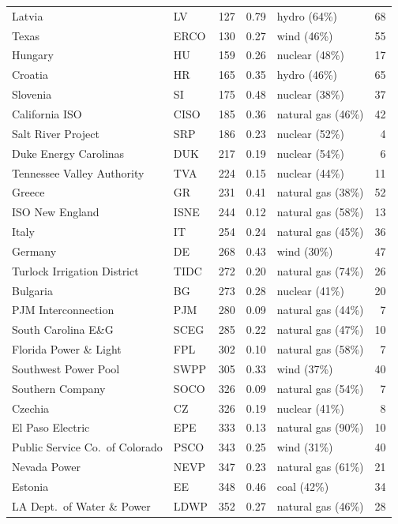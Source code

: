 {\begin{longtable}{@{}llrrlr@{}}
Latvia & LV & 127 & 0.79 & hydro (64\%) & 68 \\
Texas & ERCO & 130 & 0.27 & wind (46\%) & 55 \\
Hungary & HU & 159 & 0.26 & nuclear (48\%) & 17 \\
Croatia & HR & 165 & 0.35 & hydro (46\%) & 65 \\
Slovenia & SI & 175 & 0.48 & nuclear (38\%) & 37 \\
California ISO & CISO & 185 & 0.36 & natural gas (46\%) & 42 \\
Salt River Project & SRP & 186 & 0.23 & nuclear (52\%) & 4 \\
Duke Energy Carolinas & DUK & 217 & 0.19 & nuclear (54\%) & 6 \\
Tennessee Valley Authority & TVA & 224 & 0.15 & nuclear (44\%) & 11 \\
Greece & GR & 231 & 0.41 & natural gas (38\%) & 52 \\
ISO New England & ISNE & 244 & 0.12 & natural gas (58\%) & 13 \\
Italy & IT & 254 & 0.24 & natural gas (45\%) & 36 \\
Germany & DE & 268 & 0.43 & wind (30\%) & 47 \\
Turlock Irrigation District & TIDC & 272 & 0.20 & natural gas (74\%) & 26 \\
Bulgaria & BG & 273 & 0.28 & nuclear (41\%) & 20 \\
PJM Interconnection & PJM & 280 & 0.09 & natural gas (44\%) & 7 \\
South Carolina E\&G & SCEG & 285 & 0.22 & natural gas (47\%) & 10 \\
Florida Power \& Light & FPL & 302 & 0.10 & natural gas (58\%) & 7 \\
Southwest Power Pool & SWPP & 305 & 0.33 & wind (37\%) & 40 \\
Southern Company & SOCO & 326 & 0.09 & natural gas (54\%) & 7 \\
Czechia & CZ & 326 & 0.19 & nuclear (41\%) & 8 \\
El Paso Electric & EPE & 333 & 0.13 & natural gas (90\%) & 10 \\
Public Service Co.\ of Colorado & PSCO & 343 & 0.25 & wind (31\%) & 40 \\
Nevada Power & NEVP & 347 & 0.23 & natural gas (61\%) & 21 \\
Estonia & EE & 348 & 0.46 & coal (42\%) & 34 \\
LA Dept.\ of Water \& Power & LDWP & 352 & 0.27 & natural gas (46\%) & 28 \\

\end{longtable}}
